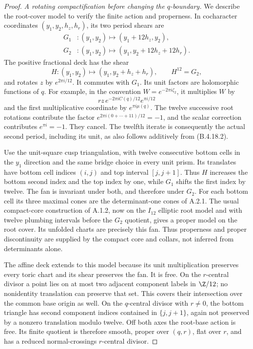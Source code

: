 \begin{proof}
\emph{A rotating compactification before changing the
$q$-boundary.}
We describe the root-cover model to verify the finite
action and properness. In cocharacter coordinates
$(y_1,y_2,h_z,h_r)$, its two period shears are
\[
 \begin{aligned}
 G_1 &: (y_1,y_2)\longmapsto(y_1+12h_z,y_2),\\
 G_2 &: (y_1,y_2)\longmapsto
                         (y_1,y_2+12h_z+12h_r).
 \end{aligned}
\]
The positive fractional deck has the shear
\[
 H:(y_1,y_2)\longmapsto(y_1,y_2+h_z+h_r),
 \qquad H^{12}=G_2,
 \tag{B.4.18.5}
\]
and rotates $z$ by $e^{2\pi i/12}$.
It commutes with $G_1$. Its unit factors are holomorphic
functions of $q$. For example, in the convention
$W=e^{-2\pi i\zeta_2}$, it multiplies $W$ by
\[
 r z\,e^{-2\pi i C(q)/12}e^{\pi i/12}
\]
and the first multiplicative coordinate by
$e^{\pi i\mu(q)}$. The twelve successive root rotations
contribute the factor
$e^{2\pi i(0+\cdots+11)/12}=-1$, and the scalar
correction contributes $e^{\pi i}=-1$.
They cancel. The twelfth iterate is consequently
the actual second period, including its unit, as
also follows additively from (B.4.18.2).

Use the unit-square cusp triangulation, with twelve
consecutive bottom cells in the $y_1$ direction and
the same bridge choice in every unit prism. Its
translates have bottom cell indices $(i,j)$ and top
interval $[j,j+1]$. Thus $H$ increases the bottom
second index and the top index by one, while $G_1$
shifts the first index by twelve. The fan is invariant
under both, and therefore under $G_2$.
For each bottom cell its three maximal cones are
the determinant-one cones of A.2.1. The usual
compact-core construction of A.1.2, now on the
$I_{12}$ elliptic root model and with twelve
plumbing intervals before the $G_2$ quotient,
gives a proper model on the root cover. Its
unfolded charts are precisely this fan. Thus
properness and proper discontinuity are supplied
by the compact core and collars, not inferred
from determinants alone.

The affine deck extends to this model because its
unit multiplication preserves every toric chart
and its shear preserves the fan. It is free.
On the $r$-central divisor a point lies on at most
two adjacent component labels in $\Z/12$; no
nonidentity translation can preserve that set.
This covers their intersection over the common
base origin as well. On the $q$-central divisor
with $r\ne0$, the bottom triangle has second
component indices contained in $\{j,j+1\}$,
again not preserved by a nonzero translation
modulo twelve. Off both axes the root-base action
is free. Its finite quotient is therefore smooth,
proper over $(q,r)$, flat over $r$, and has a
reduced normal-crossings $r$-central divisor.


\end{proof}
